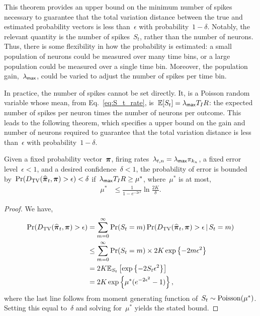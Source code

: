 This theorem provides an upper bound on the minimum number of spikes necessary to 
guarantee that the total variation distance between the true and estimated 
probability vectors is less than~$\epsilon$ with probability~$1-\delta$. 
Notably, the relevant quantity is the number of spikes~$S_t$, rather than 
the number of neurons. Thus, there is some flexibility in how the probability 
is estimated: a small population of neurons could be measured over many time bins,
or a large population could be measured over a single time bin. Moreover, the 
population gain,~$\lambda_{\mathsf{max}}$, could be varied to adjust the number of spikes 
per time bin. 

In practice, the number of spikes cannot be set directly. It, is a
Poisson random variable whose mean, from Eq.~\ref{eq:S_t_rate},
is~$\mathbb{E}[S_t] = \lambda_{\mathsf{max}} T_I R$: the expected number of spikes per neuron times the number of neurons per
outcome. This leads to the following theorem, which specifies a upper bound 
on the gain and number of neurons required to guarantee that the 
total variation distance is less than~$\epsilon$ with probability~$1-\delta$.

\begin{theorem}
  \label{thm:rate_bounds}
  Given a fixed probability vector~$\boldsymbol{\pi}$, firing
  rates~$\lambda_{t,n} = \lambda_{\mathsf{max}} \pi_{k_n}$, a fixed error
  level~$\epsilon < 1$, and a desired confidence~$\delta < 1$, the
  probability of error is bounded
  by~$\Pr({D_{\mathrm{TV}}}(\widehat{\boldsymbol{\pi}}_t, \boldsymbol{\pi}) > \epsilon) < \delta$
  if~$\lambda_{\mathsf{max}} T_I R \geq \mu^*$, where~$\mu^*$ is at most,
  \begin{align*}
    \mu^* &\leq \frac{1}{1-e^{-2\epsilon^2}} \ln \frac{2K}{\delta}.  
  \end{align*}
\end{theorem}

\begin{proof}
  We have, 
  \begin{align*}
    \Pr({D_{\mathrm{TV}}}(\widehat{\boldsymbol{\pi}}_t, \boldsymbol{\pi}) > \epsilon) 
    &= \sum_{m=0}^\infty \Pr(S_t=m) \Pr({D_{\mathrm{TV}}}(\widehat{\boldsymbol{\pi}}_t, \boldsymbol{\pi}) > \epsilon \,|\, S_t=m) \\
    &\leq \sum_{m=0}^\infty  \Pr(S_t=m) \times 2K \exp \left \{-2m\epsilon^2 \right\} \\
    &= 2K \mathbb{E}_{S_t} \left[ \exp \left \{ -2S_t \epsilon^2 \right \} \right] \\
    &= 2K \exp \left \{\mu^* (e^{-2\epsilon^2}-1) \right\},
  \end{align*}
  where the last line follows from moment generating function of~${S_t \sim \mathrm{Poisson}(\mu^*)}$.
  Setting this equal to~$\delta$ and solving for~$\mu^*$ yields the stated bound.
\end{proof}

